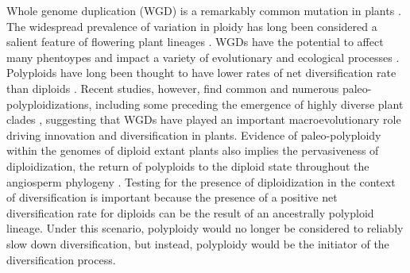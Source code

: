Whole genome duplication (WGD) is a remarkably common mutation in plants \citep{husband_2013, zenilferguson_2017}.
The widespread prevalence of variation in ploidy has long been considered a salient feature of flowering plant lineages \citep{stebbins1938}. 
WGDs have the potential to affect many phentoypes and impact a variety of evolutionary \citep{ramsey_2002} and ecological processes \citep{sessa_2019}.
Polyploids have long been thought to have lower rates of net diversification rate than diploids \citep{mayrose_2011, mayrose_2015}. 
Recent studies, however, find common and numerous paleo-polyploidizations, including some preceding the emergence of highly diverse plant clades \citep{soltis_2014, landis_2018}, suggesting that WGDs have played an important macroevolutionary role driving innovation and diversification in plants.
Evidence of paleo-polyploidy within the genomes of diploid extant plants also implies the pervasiveness of diploidization, the return of polyploids to the diploid state throughout the angiosperm phylogeny \citep{soltis_2015diploidization, dodsworth_2015}.
Testing for the presence of diploidization in the context of diversification is important because the presence of a positive net diversification rate for diploids can be the result of an ancestrally polyploid lineage.
Under this scenario, polyploidy would no longer be considered to reliably slow down diversification, but instead, polyploidy would be the initiator of the diversification process.  %


